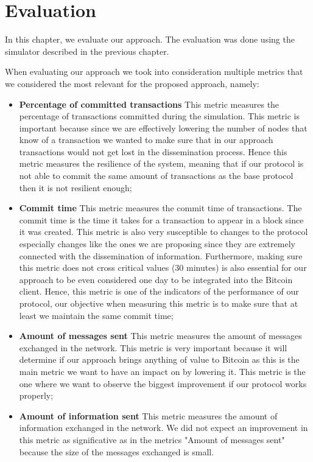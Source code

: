 \chapter{Evaluation}
\label{chap:evaluation}
In this chapter, we evaluate our approach. The evaluation was done using the simulator described in the previous chapter.

When evaluating our approach we took into consideration multiple metrics that we considered the most relevant for the proposed approach, namely:

\begin{itemize}
	\item \textbf{Percentage of committed transactions} This metric measures the percentage of transactions committed during the simulation. This metric is important because since we are effectively lowering the number of nodes that know of a transaction we wanted to make sure that in our approach transactions would not get lost in the dissemination process. Hence this metric measures the resilience of the system, meaning that if our protocol is not able to commit the same amount of transactions as the base protocol then it is not resilient enough;
	\item \textbf{Commit time} This metric measures the commit time of transactions. The commit time is the time it takes for a transaction to appear in a block since it was created. This metric is also very susceptible to changes to the protocol especially changes like the ones we are proposing since they are extremely connected with the dissemination of information. Furthermore, making sure this metric does not cross critical values (30 minutes) is also essential for our approach to be even considered one day to be integrated into the Bitcoin client. Hence, this metric is one of the indicators of the performance of our protocol, our objective when measuring this metric is to make sure that at least we maintain the same commit time;
	\item \textbf{Amount of messages sent} This metric measures the amount of messages exchanged in the network. This metric is very important because it will determine if our approach brings anything of value to Bitcoin as this is the main metric we want to have an impact on by lowering it. This metric is the one where we want to observe the biggest improvement if our protocol works properly;
	\item \textbf{Amount of information sent} This metric measures the amount of information exchanged in the network. We did not expect an improvement in this metric as significative as in the metrics "Amount of messages sent" because the size of the messages exchanged is small.  
\end{itemize}

